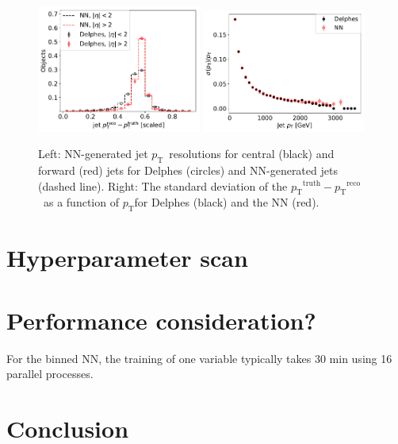 \documentclass[showpacs,showkeys,preprint,prd,nofootinbib,linenumbers,12pt]{revtex4-1}
\def\pt{\ensuremath{p_{\mathrm{T}}}}
\def\ptRes{\ensuremath{\pt^{\mathrm{truth}}-\pt^{\mathrm{reco}}}}
\begin{document}
\begin{figure}[htb]
  \includegraphics[width=0.48\textwidth]{jet_pTResLowEta.pdf}
  \includegraphics[width=0.48\textwidth]{jet_pTResOrigScale_std.pdf}
  \caption{Left: NN-generated jet \pt\ resolutions for central (black) and forward (red) jets for Delphes (circles) and NN-generated jets (dashed line).
  Right: The standard deviation of the \ptRes\ as a function of \pt for Delphes (black) and the NN (red).}
  \label{fig:plot_ptres_eta_unbinned}
\end{figure}

\section{Hyperparameter scan}

\section{Performance consideration?}
For the binned NN, the training of one variable typically takes 30 min using 16 parallel processes.

\section{Conclusion}
\end{document}
